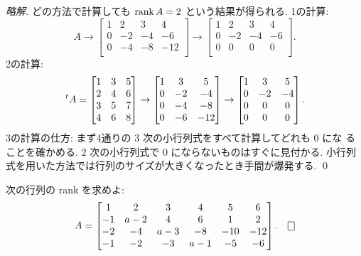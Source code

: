 \documentclass[12pt,twoside]{jarticle}
\newcommand\commentout[1]{#1}
\newcommand\commentout[1]{}
\begin{document}
\commentout{
\begin{proof}[略解]
  どの方法で計算しても $\mathop{\mathrm{rank}}\nolimits A = 2$ という結果が得られる.  
  1の計算:
  \begin{equation*}
    A \to 
    \begin{bmatrix}
      1 &  2 &  3 &   4 \\
      0 & -2 & -4 &  -6 \\
      0 & -4 & -8 & -12 \\
    \end{bmatrix}
    \to
    \begin{bmatrix}
      1 &  2 &  3 &  4 \\
      0 & -2 & -4 & -6 \\
      0 &  0 &  0 &  0 \\
    \end{bmatrix}.
  \end{equation*}
  2の計算:
  \begin{equation*}
    \tp{A} =
    \begin{bmatrix}
      1 & 3 & 5 \\
      2 & 4 & 6 \\
      3 & 5 & 7 \\
      4 & 6 & 8 \\
    \end{bmatrix}
    \to
    \begin{bmatrix}
      1 &  3 &   5 \\
      0 & -2 &  -4 \\
      0 & -4 &  -8 \\
      0 & -6 & -12 \\
    \end{bmatrix}
    \to
    \begin{bmatrix}
      1 &  3 &  5 \\
      0 & -2 & -4 \\
      0 &  0 &  0 \\
      0 &  0 &  0 \\
    \end{bmatrix}.
  \end{equation*}
  3の計算の仕方: まず4通りの $3$ 次の小行列式をすべて計算してどれも $0$ にな
  ることを確かめる. $2$ 次の小行列式で $0$ にならないものはすぐに見付かる.
  小行列式を用いた方法では行列のサイズが大きくなったとき手間が爆発する.
  \qed
\end{proof}
}


\begin{question}
  \label{q:rank-4}
  次の行列の rank を求めよ:
  \begin{equation*}
    A = 
    \begin{bmatrix}
       1 &  2  &  3  &  4  &   5 &   6 \\
      -1 & a-2 &  4  &  6  &   1 &   2 \\
      -2 & -4  & a-3 & -8  & -10 & -12 \\
      -1 & -2  & -3  & a-1 &  -5 &  -6 \\
    \end{bmatrix}.
    \qed
  \end{equation*}
\end{question}
\end{document}
